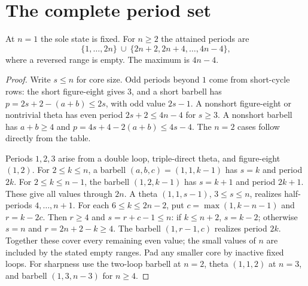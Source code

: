 \section{The complete period set}
\begin{corollary}\label{cor:set}
At $n=1$ the sole state is fixed. For $n\ge2$ the attained periods are
\begin{equation}\label{eq:set}
 \{1,\ldots,2n\}\ \cup\ \{2n+2,2n+4,\ldots,4n-4\},
\end{equation}
where a reversed range is empty. The maximum is $4n-4$.
\end{corollary}
\begin{proof}
Write $s\le n$ for core size. Odd periods beyond $1$ come from short-cycle
rows: the short figure-eight gives $3$, and a short barbell has
$p=2s+2-(a+b)\le2s$, with odd value $2s-1$. A nonshort figure-eight or
nontrivial theta has even period $2s+2\le4n-4$ for $s\ge3$.
A nonshort barbell has $a+b\ge4$ and
$p=4s+4-2(a+b)\le4s-4$. The $n=2$ cases follow directly from the table.

Periods $1,2,3$ arise from a double loop, triple-direct theta, and
figure-eight $(1,2)$. For $2\le k\le n$, a barbell $(a,b,c)=(1,1,k-1)$
has $s=k$ and period $2k$. For $2\le k\le n-1$, the barbell
$(1,2,k-1)$ has $s=k+1$ and period $2k+1$. These give all values through
$2n$. A theta $(1,1,s-1)$, $3\le s\le n$, realizes half-periods
$4,\ldots,n+1$. For each $6\le k\le2n-2$, put
$c=\max(1,k-n-1)$ and $r=k-2c$. Then $r\ge4$ and
$s=r+c-1\le n$: if $k\le n+2$, $s=k-2$; otherwise $s=n$ and
$r=2n+2-k\ge4$. The barbell $(1,r-1,c)$ realizes period $2k$.
Together these cover every remaining even value; the small values of $n$
are included by the stated empty ranges. Pad any smaller core by inactive
fixed loops. For sharpness use the two-loop barbell at $n=2$, theta
$(1,1,2)$ at $n=3$, and barbell $(1,3,n-3)$ for $n\ge4$.
\end{proof}
